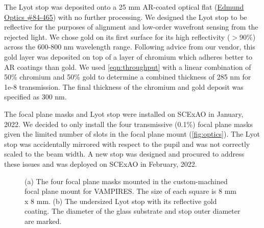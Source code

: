 \documentclass[]{spie}  %
\begin{document}
The Lyot stop was deposited onto a 25 mm AR-coated optical flat (\href{https://www.edmundoptics.com/p/25mm-dia-3mm-thick-nir-i-coated-lambda10-fused-silica-window/27561/}{Edmund Optics \#84-465}) with no further processing. We designed the Lyot stop to be reflective for the purposes of alignment and low-order wavefront sensing from the rejected light. We chose gold on its first surface for its high reflectivity ($>$90\%) across the 600-800 nm wavelength range. Following advice from our vendor, this gold layer was deposited on top of a layer of chromium which adheres better to AR coatings than gold. We used \autoref{eqn:throughput} with a linear combination of 50\% chromium and 50\% gold to determine a combined thickness of 285 nm for 1e-8 transmission. The final thickness of the chromium and gold deposit was specified as 300 nm.

The focal plane masks and Lyot stop were installed on SCExAO in January, 2022. We decided to only install the four  transmissive (0.1\%) focal plane masks given the limited number of slots in the focal plane mount (\autoref{fig:optics}). The Lyot stop was accidentally mirrored with respect to the pupil and was not correctly scaled to the beam width. A new stop was designed and procured to address these issues and was deployed on SCExAO in February, 2022.

\begin{figure}
   \centering
   \hspace{0.5in}
   \caption{(a) The four focal plane masks mounted in the custom-machined focal plane mount for VAMPIRES. The size of each square is 8 mm x 8 mm. (b) The undersized Lyot stop with its reflective gold coating. The diameter of the glass substrate and stop outer diameter are marked.}\label{fig:optics}
\end{figure}
\end{document}
